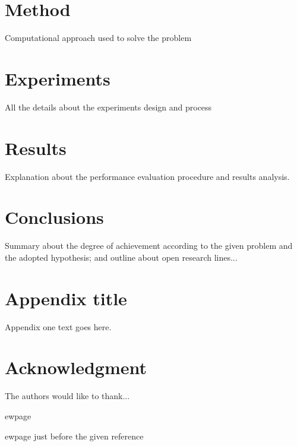 \documentclass[journal,onecolumn]{IEEEtran}
\begin{document}
\section{Method}

Computational approach used to solve the problem

\section{Experiments}

All the details about the experiments design and process

\section{Results}
Explanation about the performance evaluation procedure and results analysis.

\section{Conclusions}

Summary about the degree of achievement according to the given problem and the adopted hypothesis; and outline about open research lines...


\appendices
\section{Appendix title}
Appendix one text goes here.


\section*{Acknowledgment}


The authors would like to thank...


\ifCLASSOPTIONcaptionsoff
  
ewpage
\fi



ewpage just before the given reference

\end{document}
